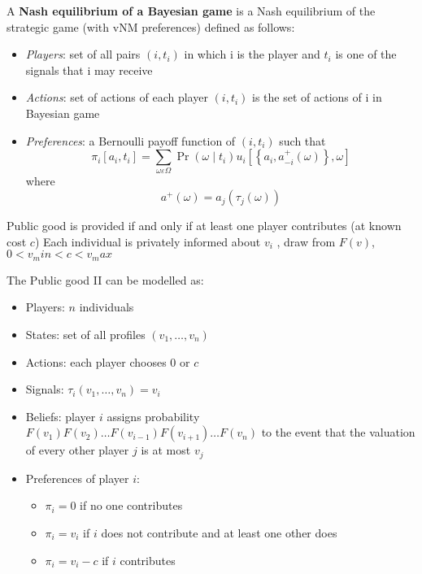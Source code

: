 \begin{definition}
      A \textbf{Nash equilibrium of a Bayesian game} is a Nash equilibrium of the strategic game
      (with vNM preferences) defined as follows:
      \begin{itemize}
            \item \textit{Players}: set of all pairs $(i,t_i)$ in which i is the player and $t_i$ is one of the signals that i may receive
            \item \textit{Actions}: set of actions of each player $(i,t_i)$ is the set of actions of i in Bayesian game
            \item \textit{Preferences}: a Bernoulli payoff function of $(i,t_i)$ such that
                  \[
                        \pi_{i} [a_{i}, t_{i}] = \sum_{\omega \varepsilon \Omega} \operatorname{Pr}\left(\omega \mid t_{i}\right) u_{i}\left[\left\{a_{i}, a_{-i}^{+}(\omega)\right\}, \omega\right]
                  \]
                  where
                  \[
                        a^{+}(\omega) = a_j(\tau_j(\omega))
                  \]
      \end{itemize}
\end{definition}


\begin{example}
      Public good is provided if and only if at least one player contributes (at known cost $c$)
      Each individual is privately informed about $v_i$ , draw from $F(v)$, $0 < v_min < c < v_max$
\end{example}


\begin{example} 
      The Public good II can be modelled as:
      \begin{itemize}
            \item Players: $n$ individuals
            \item States: set of all profiles $(v_1 , \ldots , v_n )$
            \item Actions: each player chooses $0$ or $c$
            \item Signals: $τ_i (v_1 ,\ldots, v_n ) = v_i$
            \item Beliefs: player $i$ assigns probability $F(v_1 ) F(v_2 )\ldots F(v_{i-1} ) F(v_{i+1} )\ldots F(v_n )$ to the event that the valuation of every other player $j$ is at most $v_j$
            \item Preferences of player $i$:
                  \begin{itemize}
                        \item $\pi_i =0$ if no one contributes
                        \item $\pi_i =v_i$ if $i$ does not contribute and at least one other does
                        \item $\pi_i =v_i - c$ if $i$ contributes
                  \end{itemize}
      \end{itemize}
\end{example}


